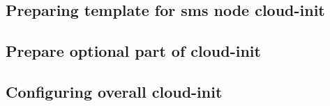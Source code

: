 \documentclass[letterpaper]{article}
\newcommand{\install}{yum -y install}
\newcommand{\groupinstall}{yum -y groupinstall}
\begin{document}
\subsection{Preparing template for sms node cloud-init} \label{sec:c_i-template-sms-node}

	

\subsection{Prepare optional part of cloud-init} \label{sec:c_i-optional}



\subsection{Configuring overall cloud-init} \label{sec:c_i-config}




\end{document}
